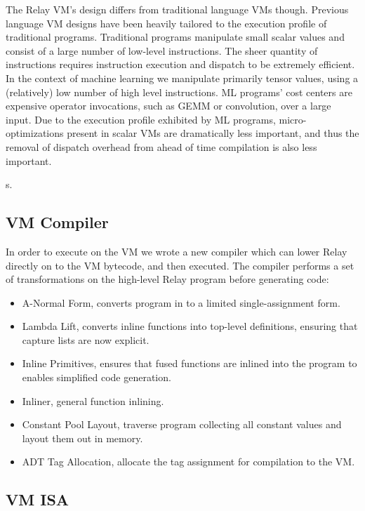 The Relay VM's design differs from traditional language VMs though.
Previous language VM designs have been heavily
  tailored to the execution profile of traditional programs.
Traditional programs manipulate small scalar values
  and consist of a large number of low-level instructions.
The sheer quantity of instructions requires instruction execution
  and dispatch to be extremely efficient.
In the context of machine learning we manipulate primarily tensor values,
  using a (relatively) low number of high level instructions.
ML programs’ cost centers are expensive operator invocations,
  such as GEMM or convolution, over a large input.
Due to the execution profile exhibited by ML programs,
  micro-optimizations present in scalar VMs are dramatically less important,
  and thus the removal of dispatch overhead from ahead of time compilation
  is also less important.

s.

\subsection{VM Compiler}

In order to execute on the VM we wrote a new compiler which
  can lower Relay directly on to the VM bytecode, and then
  executed.
The compiler performs a set of transformations on the high-level
  Relay program before generating code:
\begin{itemize}
  \item A-Normal Form, converts program in to a limited single-assignment form.
  \item Lambda Lift, converts inline functions into top-level definitions,
        ensuring that capture lists are now explicit.
  \item Inline Primitives, ensures that fused functions are inlined into
        the program to enables simplified code generation.
  \item Inliner, general function inlining.
  \item Constant Pool Layout, traverse program collecting all constant values
        and layout them out in memory.
  \item ADT Tag Allocation, allocate the tag assignment for compilation
        to the VM.
\end{itemize}


\subsection{VM ISA}


